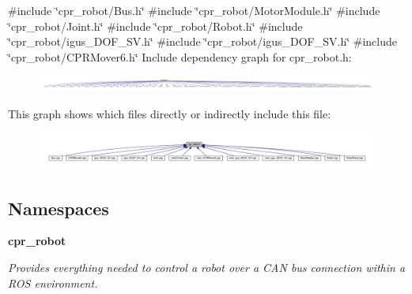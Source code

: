 {\ttfamily \#include \char`\"{}cpr\+\_\+robot/\+Bus.\+h\char`\"{}}\newline
{\ttfamily \#include \char`\"{}cpr\+\_\+robot/\+Motor\+Module.\+h\char`\"{}}\newline
{\ttfamily \#include \char`\"{}cpr\+\_\+robot/\+Joint.\+h\char`\"{}}\newline
{\ttfamily \#include \char`\"{}cpr\+\_\+robot/\+Robot.\+h\char`\"{}}\newline
{\ttfamily \#include \char`\"{}cpr\+\_\+robot/igus\+\_\+D\+O\+F\+\_\+\+S\+V.\+h\char`\"{}}\newline
{\ttfamily \#include \char`\"{}cpr\+\_\+robot/igus\+\_\+D\+O\+F\+\_\+\+S\+V.\+h\char`\"{}}\newline
{\ttfamily \#include \char`\"{}cpr\+\_\+robot/\+C\+P\+R\+Mover6.\+h\char`\"{}}\newline
Include dependency graph for cpr\+\_\+robot.\+h\+:
\nopagebreak
\begin{figure}[H]
\begin{center}
\leavevmode
\includegraphics[width=350pt]{cpr__robot_8h__incl}
\end{center}
\end{figure}
This graph shows which files directly or indirectly include this file\+:
\nopagebreak
\begin{figure}[H]
\begin{center}
\leavevmode
\includegraphics[width=350pt]{cpr__robot_8h__dep__incl}
\end{center}
\end{figure}
\subsection*{Namespaces}
\begin{DoxyCompactItemize}
\item 
 \textbf{ cpr\+\_\+robot}
\begin{DoxyCompactList}\small\item\em Provides everything needed to control a robot over a C\+AN bus connection within a R\+OS environment. \end{DoxyCompactList}\end{DoxyCompactItemize}
